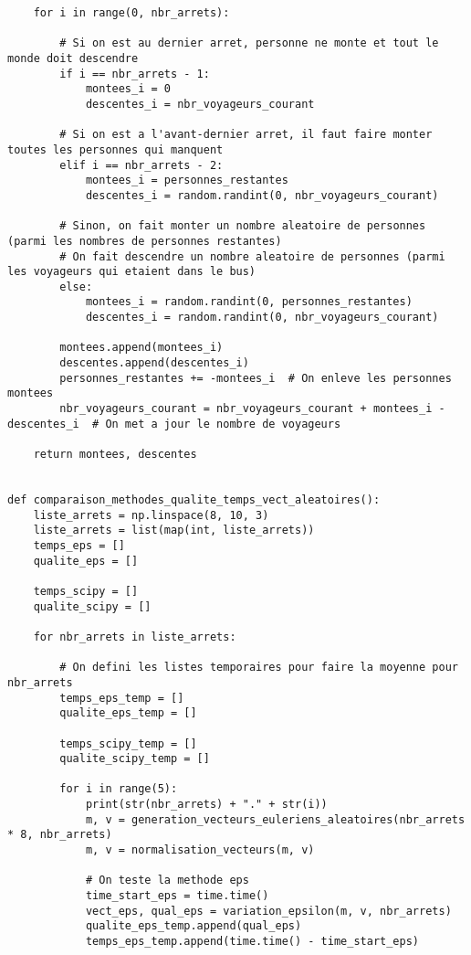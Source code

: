 \documentclass[12pt]{article}
\begin{document}
\begin{lstlisting}
    for i in range(0, nbr_arrets):

        # Si on est au dernier arret, personne ne monte et tout le monde doit descendre
        if i == nbr_arrets - 1:
            montees_i = 0
            descentes_i = nbr_voyageurs_courant

        # Si on est a l'avant-dernier arret, il faut faire monter toutes les personnes qui manquent
        elif i == nbr_arrets - 2:
            montees_i = personnes_restantes
            descentes_i = random.randint(0, nbr_voyageurs_courant)

        # Sinon, on fait monter un nombre aleatoire de personnes (parmi les nombres de personnes restantes)
        # On fait descendre un nombre aleatoire de personnes (parmi les voyageurs qui etaient dans le bus)
        else:
            montees_i = random.randint(0, personnes_restantes)
            descentes_i = random.randint(0, nbr_voyageurs_courant)

        montees.append(montees_i)
        descentes.append(descentes_i)
        personnes_restantes += -montees_i  # On enleve les personnes montees
        nbr_voyageurs_courant = nbr_voyageurs_courant + montees_i - descentes_i  # On met a jour le nombre de voyageurs

    return montees, descentes


def comparaison_methodes_qualite_temps_vect_aleatoires():
    liste_arrets = np.linspace(8, 10, 3)
    liste_arrets = list(map(int, liste_arrets))
    temps_eps = []
    qualite_eps = []

    temps_scipy = []
    qualite_scipy = []

    for nbr_arrets in liste_arrets:

        # On defini les listes temporaires pour faire la moyenne pour nbr_arrets
        temps_eps_temp = []
        qualite_eps_temp = []

        temps_scipy_temp = []
        qualite_scipy_temp = []

        for i in range(5):
            print(str(nbr_arrets) + "." + str(i))
            m, v = generation_vecteurs_euleriens_aleatoires(nbr_arrets * 8, nbr_arrets)
            m, v = normalisation_vecteurs(m, v)

            # On teste la methode eps
            time_start_eps = time.time()
            vect_eps, qual_eps = variation_epsilon(m, v, nbr_arrets)
            qualite_eps_temp.append(qual_eps)
            temps_eps_temp.append(time.time() - time_start_eps)


\end{lstlisting}
\end{document}
